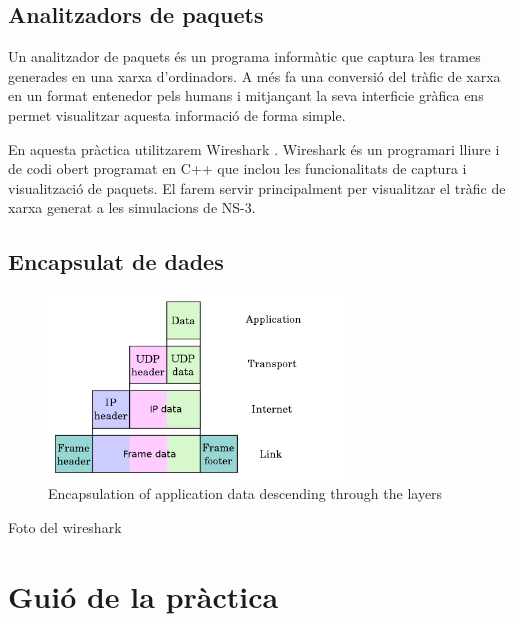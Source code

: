 \documentclass[12pt,a4paper]{article}
\begin{document}

\subsection*{Analitzadors de paquets}
Un analitzador de paquets és un programa informàtic que captura les trames generades en una xarxa d'ordinadors. A més fa una conversió del tràfic de xarxa en un format entenedor pels humans i mitjançant la seva interficie gràfica  ens permet visualitzar aquesta informació de forma simple.

En aquesta pràctica utilitzarem Wireshark \cite{wireshark}. Wireshark és un programari lliure i de codi obert programat en C++ que inclou les funcionalitats de captura i visualització de paquets. El farem servir principalment per visualitzar el tràfic de xarxa generat a les simulacions de NS-3.

\subsection*{Encapsulat de dades}
\begin{figure}[!ht]
  \begin{center}
    \includegraphics[width=0.7\textwidth]{encapsulation}
    \caption{Encapsulation of application data descending through the layers}
    \label{osi-stack}
  \end{center}
\end{figure}
Foto del wireshark

\section{Guió de la pràctica}
\end{document}
